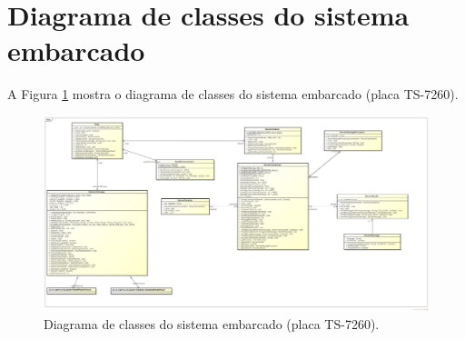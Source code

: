 \section{Diagrama de classes do sistema embarcado}


A Figura \ref{fig:diagrama_classes_sist_embarcado} mostra o diagrama de classes do sistema embarcado (placa TS-7260).
\begin{figure}[H]
  \centering
  \includegraphics[width=\textwidth]{./figuras/sistEmbarcado/class_sistEmbarcado.jpg}
  \caption{Diagrama de classes do sistema embarcado (placa TS-7260).}
  \label{fig:diagrama_classes_sist_embarcado}
\end{figure}




